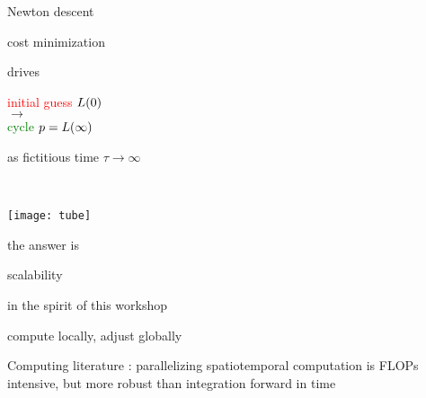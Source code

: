 \begin{frame}{Newton descent}
\bigskip

cost minimization

\bigskip

\begin{center}
\begin{minipage}[c]{0.55\textwidth}
\begin{center}
\bigskip

drives

\bigskip

	\vskip 1.0cm

\textcolor{red}{initial guess $L(0)$}
\\$\to$\\
\textcolor{green}{cycle $p = L(\infty)$}

	\vskip 1.0cm

as fictitious time $\tau \to \infty$
\end{center}
\end{minipage}%
~~~~~~~\begin{minipage}[c]{0.40\textwidth}
	\begin{center}
	\texttt{[image: tube]}
	\end{center}
\end{minipage}
\end{center}
\end{frame}

\begin{frame}{the answer is}

\vfill

{\Huge
scalability
                  }

\vfill

\hfill in the spirit of this workshop
\end{frame}


\begin{frame}{compute locally, adjust globally}

Computing literature : parallelizing {\color{red}spatiotemporal}
computation is FLOPs intensive, but more robust than
integration forward in time
\end{frame}


